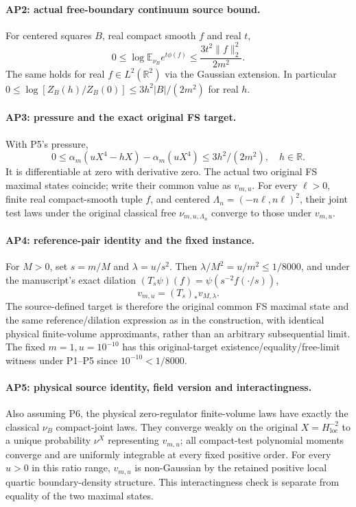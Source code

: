 \documentclass[11pt]{article}
\theoremstyle{plain}
\theoremstyle{definition}
\theoremstyle{remark}
\newcommand{\R}{\mathbb{R}}
\newcommand{\E}{\mathbb{E}}
\begin{document}
\paragraph{AP2: actual free-boundary continuum source bound.}
For centered squares $B$, real compact smooth $f$ and real $t$,
\[
 0\le\log\E_{\nu_B}e^{t\phi(f)}\le\frac{3t^2\|f\|_2^2}{2m^2}.
\]
The same holds for real $f\in L^2(\R^2)$ via the Gaussian extension.
In particular $0\le\log[Z_B(h)/Z_B(0)]\le3h^2|B|/(2m^2)$ for real $h$.

\paragraph{AP3: pressure and the exact original FS target.}
With P5's pressure,
\[
 0\le\alpha_m(uX^4-hX)-\alpha_m(uX^4)\le3h^2/(2m^2),\quad h\in\R.
\]
It is differentiable at zero with derivative zero. The actual two original
FS maximal states coincide; write their common value as $v_{m,u}$.
For every $\ell>0$, finite real compact-smooth tuple $f$, and centered
$\Lambda_n=(-n\ell,n\ell)^2$, their joint test laws under the original
classical free $\nu_{m,u,\Lambda_n}$ converge to those under $v_{m,u}$.

\paragraph{AP4: reference-pair identity and the fixed instance.}
For $M>0$, set $s=m/M$ and $\lambda=u/s^2$.
Then $\lambda/M^2=u/m^2\le1/8000$, and under the manuscript's exact
dilation $(T_s\psi)(f)=\psi(s^{-2}f(\cdot/s))$,
\[
 v_{m,u}=(T_s)_*v_{M,\lambda}.
\]
The source-defined target is therefore the original common FS maximal
state and the same reference/dilation expression as in the construction,
with identical physical finite-volume approximants, rather than an arbitrary
subsequential limit. The fixed $m=1,u=10^{-10}$ has this original-target
existence/equality/free-limit witness under P1--P5 since $10^{-10}<1/8000$.

\paragraph{AP5: physical source identity, field version and interactingness.}
Also assuming P6, the physical zero-regulator finite-volume laws have
exactly the classical $\nu_B$ compact-joint laws. They converge weakly on
the original $X=H^{-2}_{\mathrm{loc}}$ to a unique probability $\nu^X$
representing $v_{m,u}$; all compact-test polynomial moments converge and
are uniformly integrable at every fixed positive order. For every $u>0$
in this ratio range, $v_{m,u}$ is non-Gaussian by the retained positive local
quartic boundary-density structure. This interactingness check is separate
from equality of the two maximal states.
\end{document}
